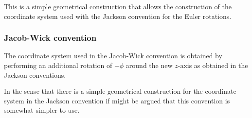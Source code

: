 This is a simple geometrical construction that allows the construction 
of the coordinate system used with the Jackson convention for the
Euler rotations.

\subsubsection{Jacob-Wick convention}

The coordinate system used in the Jacob-Wick convention is obtained by
performing an additional rotation of $-\phi$ around the new $z$-axis
as obtained in the Jackson conventions. 

In the sense that there is a simple geometrical construction for the 
coordinate system in the Jackson convention if might be argued that
this convention is somewhat simpler to use. 

